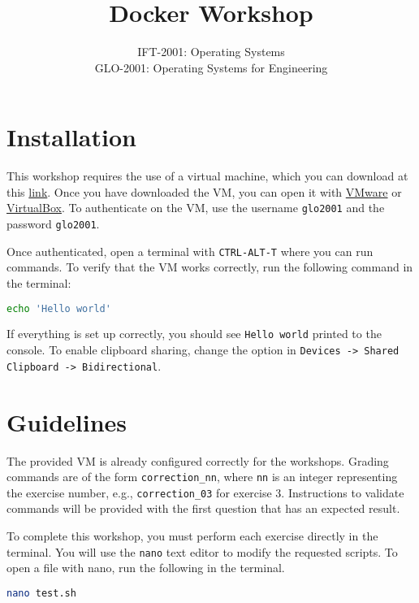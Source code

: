 \documentclass[french]{article}
\title{Docker Workshop}
\author{IFT-2001: Operating Systems\\GLO-2001: Operating Systems for Engineering}
\date{}
\begin{document}
\maketitle

\section{Installation}

This workshop requires the use of a virtual machine, which you can download at this \href{https://ulavaldti-my.sharepoint.com/:u:/g/personal/masai45_ulaval_ca/Eblxxgdr3wRHqzPLtN5Kk8ABlj5v4ZDVMP3_A3IUaAc24A?e=OepHXl}{link}.
Once you have downloaded the VM, you can open it with \href{https://www.vmware.com/}{VMware} or \href{https://www.virtualbox.org/}{VirtualBox}.
To authenticate on the VM, use the username \texttt{glo2001} and the password \texttt{glo2001}.

Once authenticated, open a terminal with \texttt{CTRL-ALT-T} where you can run commands.
To verify that the VM works correctly, run the following command in the terminal:

\begin{lstlisting}[language=bash]
echo 'Hello world'
\end{lstlisting}

If everything is set up correctly, you should see \texttt{Hello world} printed to the console.
To enable clipboard sharing, change the option in \texttt{Devices -> Shared Clipboard -> Bidirectional}.

\section{Guidelines}

The provided VM is already configured correctly for the workshops.
Grading commands are of the form \texttt{correction\_nn}, where \texttt{nn} is an integer representing the exercise number, e.g., \texttt{correction\_03} for exercise 3.
Instructions to validate commands will be provided with the first question that has an expected result.

To complete this workshop, you must perform each exercise directly in the terminal.
You will use the \texttt{nano} text editor to modify the requested scripts.
To open a file with nano, run the following in the terminal.

\begin{lstlisting}[language=bash]
nano test.sh
\end{lstlisting}
\end{document}

